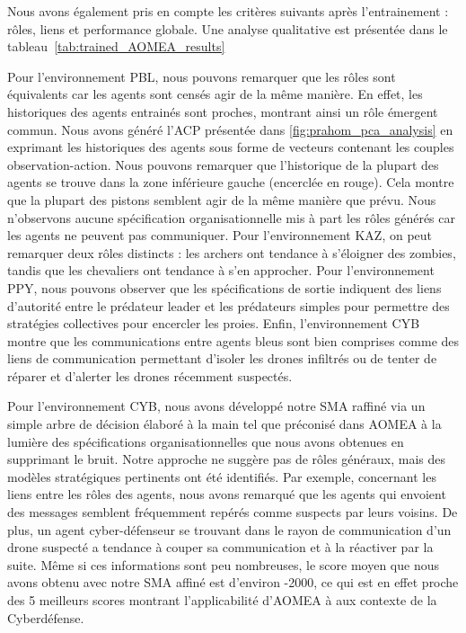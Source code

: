 \documentclass[contribution]{jfsma}
\begin{document}
Nous avons également pris en compte les critères suivants après l'entrainement : rôles, liens et performance globale. Une analyse qualitative est présentée dans le tableau~\ref{tab:trained_AOMEA_results}
%

%
%
Pour l'environnement PBL, nous pouvons remarquer que les rôles sont équivalents car les agents sont censés agir de la même manière. En effet, les historiques des agents entrainés sont proches, montrant ainsi un rôle émergent commun. Nous avons généré l'ACP présentée dans \autoref{fig:prahom_pca_analysis} en exprimant les historiques des agents sous forme de vecteurs contenant les couples observation-action. Nous pouvons remarquer que l'historique de la plupart des agents se trouve dans la zone inférieure gauche (encerclée en rouge). Cela montre que la plupart des pistons semblent agir de la même manière que prévu. Nous n'observons aucune spécification organisationnelle mis à part les rôles générés car les agents ne peuvent pas communiquer. Pour l'environnement KAZ, on peut remarquer deux rôles distincts : les archers ont tendance à s'éloigner des zombies, tandis que les chevaliers ont tendance à s'en approcher. Pour l'environnement PPY, nous pouvons observer que les spécifications de sortie indiquent des liens d'autorité entre le prédateur leader et les prédateurs simples pour permettre des stratégies collectives pour encercler les proies. Enfin, l’environnement CYB montre que les communications entre agents bleus sont bien comprises comme des liens de communication permettant d’isoler les drones infiltrés ou de tenter de réparer et d’alerter les drones récemment suspectés.

Pour l'environnement CYB, nous avons développé notre SMA raffiné via un simple arbre de décision élaboré à la main tel que préconisé dans AOMEA à la lumière des spécifications organisationnelles que nous avons obtenues en supprimant le bruit. Notre approche ne suggère pas de rôles généraux, mais des modèles stratégiques pertinents ont été identifiés. Par exemple, concernant les liens entre les rôles des agents, nous avons remarqué que les agents qui envoient des messages semblent fréquemment repérés comme suspects par leurs voisins. De plus, un agent cyber-défenseur se trouvant dans le rayon de communication d’un drone suspecté a tendance à couper sa communication et à la réactiver par la suite. Même si ces informations sont peu nombreuses, le score moyen que nous avons obtenu avec notre SMA affiné est d'environ -2000, ce qui est en effet proche des 5 meilleurs scores montrant l'applicabilité d'AOMEA à aux contexte de la Cyberdéfense.
\end{document}
